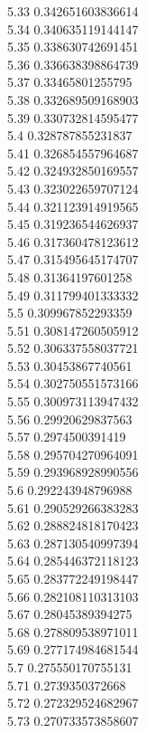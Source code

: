 {5.33	0.342651603836614\\
5.34	0.340635119144147\\
5.35	0.338630742691451\\
5.36	0.336638398864739\\
5.37	0.33465801255795\\
5.38	0.332689509168903\\
5.39	0.330732814595477\\
5.4	0.328787855231837\\
5.41	0.326854557964687\\
5.42	0.324932850169557\\
5.43	0.323022659707124\\
5.44	0.321123914919565\\
5.45	0.319236544626937\\
5.46	0.317360478123612\\
5.47	0.315495645174707\\
5.48	0.31364197601258\\
5.49	0.311799401333332\\
5.5	0.309967852293359\\
5.51	0.308147260505912\\
5.52	0.306337558037721\\
5.53	0.30453867740561\\
5.54	0.302750551573166\\
5.55	0.300973113947432\\
5.56	0.29920629837563\\
5.57	0.2974500391419\\
5.58	0.295704270964091\\
5.59	0.293968928990556\\
5.6	0.292243948796988\\
5.61	0.290529266383283\\
5.62	0.288824818170423\\
5.63	0.287130540997394\\
5.64	0.285446372118123\\
5.65	0.283772249198447\\
5.66	0.282108110313103\\
5.67	0.28045389394275\\
5.68	0.278809538971011\\
5.69	0.277174984681544\\
5.7	0.275550170755131\\
5.71	0.2739350372668\\
5.72	0.272329524682967\\
5.73	0.270733573858607\\
}
